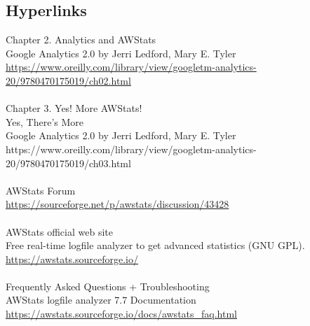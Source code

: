 
\subsection{Hyperlinks}

Chapter 2. Analytics and AWStats\\
Google Analytics 2.0 by Jerri Ledford, Mary E. Tyler\\
\href{https://www.oreilly.com/library/view/googletm-analytics-20/9780470175019/ch02.html}{https://www.oreilly.com/library/view/googletm-analytics-20/9780470175019/ch02.html}\\
\\
Chapter 3. Yes! More AWStats!\\
Yes, There’s More\\
Google Analytics 2.0 by Jerri Ledford, Mary E. Tyler\\
https://www.oreilly.com/library/view/googletm-analytics-20/9780470175019/ch03.html\\
\\
AWStats Forum\\
\href{https://sourceforge.net/p/awstats/discussion/43428}{https://sourceforge.net/p/awstats/discussion/43428}\\
\\
AWStats official web site\\
Free real-time logfile analyzer to get advanced statistics (GNU GPL).\\
\href{https://awstats.sourceforge.io/}{https://awstats.sourceforge.io/}\\
\\
Frequently Asked Questions + Troubleshooting\\
AWStats logfile analyzer 7.7 Documentation\\
\href{https://awstats.sourceforge.io/docs/awstats\_faq.html}{https://awstats.sourceforge.io/docs/awstats\_faq.html}

